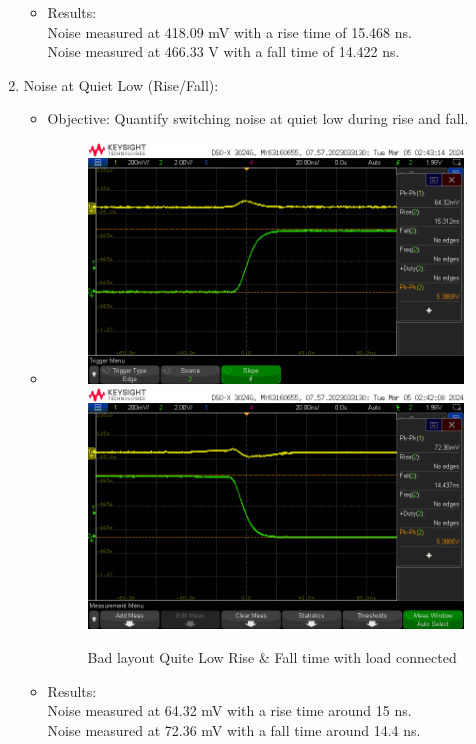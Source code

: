 \documentclass[a4paper,11pt]{article}%
\begin{document}
\begin{enumerate}
\begin{itemize}
		
		\item Results:\\
		Noise measured at 418.09 mV with a rise time of 15.468 ns.\\
		Noise measured at 466.33 V with a fall time of 14.422 ns.
	\end{itemize}

	\item Noise at Quiet Low (Rise/Fall):
	\begin{itemize}
		\item Objective: Quantify switching noise at quiet low during rise and fall.
		\item 
		\begin{figure}[H]
			\centering
			\includegraphics[scale=0.6]{figures/bad/quite_low/rise/rising_ql_bad1.png}
			\includegraphics[scale=0.6]{figures/bad/quite_low/fall/falling_ql_bad.png}
			\caption{Bad layout Quite Low Rise \& Fall time with load connected}
		\end{figure}
		\item Results:\\
		Noise measured at 64.32 mV with a rise time around 15 ns.\\
		Noise measured at 72.36 mV with a fall time around 14.4 ns.\\
	\end{itemize}
	
	
\end{enumerate}
\end{document}
